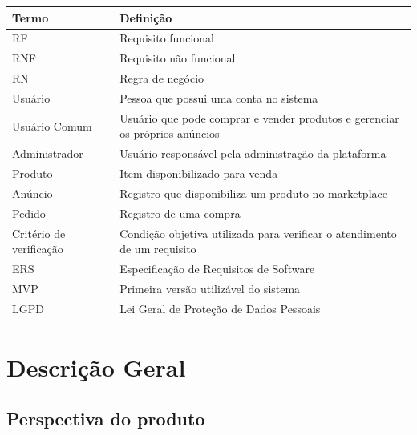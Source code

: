 \documentclass{scrreprt}
\begin{document}
\begin{center}
	\begin{tabular}{@{} l p{10.5cm} @{}}
		\toprule
		\textbf{Termo}         & \textbf{Definição}                                              \\
		\midrule
		RF                     & Requisito funcional                                             \\
		RNF                    & Requisito não funcional                                         \\
		RN                     & Regra de negócio                                                \\
		Usuário                & Pessoa que possui uma conta no sistema                          \\
		Usuário Comum          & Usuário que pode comprar e vender produtos e gerenciar os próprios anúncios \\
		Administrador          & Usuário responsável pela administração da plataforma            \\
		Produto                & Item disponibilizado para venda                                 \\
		Anúncio                & Registro que disponibiliza um produto no marketplace            \\
		Pedido                 & Registro de uma compra                                          \\
		Critério de verificação & Condição objetiva utilizada para verificar o atendimento de um requisito \\
		ERS                    & Especificação de Requisitos de Software                         \\
		MVP                    & Primeira versão utilizável do sistema                           \\
		LGPD                   & Lei Geral de Proteção de Dados Pessoais                         \\
		\bottomrule
	\end{tabular}
\end{center}

\chapter{Descrição Geral}

\section{Perspectiva do produto}
\end{document}
